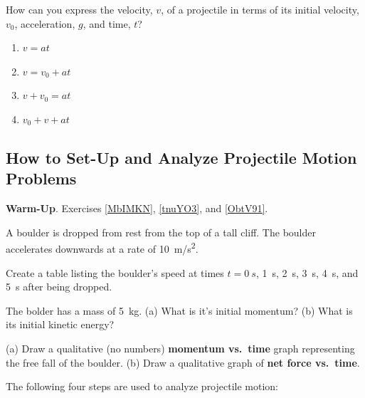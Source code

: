 \documentclass[main-physics.tex]{subfiles}
\begin{document}
\begin{exercise} \label{wlbvvu}
    How can you express the velocity, $v$, of a projectile in terms of its initial velocity, $v_0$, acceleration, $g$, and time, $t$?
\end{exercise}

\begin{enumerate}[label=\Alph*.]
    \item $v = at$
    \item $v = v_0 + a t$
    \item $v + v_0 = at$
    \item $v_0 + v + at$
\end{enumerate} 

\subsection{How to Set-Up and Analyze Projectile Motion Problems} \label{Qxc2Cv}

\begin{mdframed}[backgroundcolor=csOrange]
    \textbf{Warm-Up}. Exercises \ref{MbIMKN}, \ref{tnuYO3}, and \ref{ObtV91}.

    \vspace{1ex}
    
    A boulder is dropped from rest from the top of a tall cliff. The boulder accelerates downwards at a rate of \SI{10}{m/s^2}.

    \begin{exercise} \label{MbIMKN}
        Create a table listing the boulder's speed at times $t = \SI{0}{s}$, \SI{1}{s}, \SI{2}{s}, \SI{3}{s}, \SI{4}{s}, and \SI{5}{s} after being dropped.
    \end{exercise}

    \begin{exercise} \label{tnuYO3}
        The bolder has a mass of \SI{5}{kg}. (a) What is it's initial momentum? (b) What is its initial kinetic energy?
    \end{exercise}

    \begin{exercise} \label{ObtV91}
        (a) Draw a qualitative (no numbers) \textbf{momentum vs.~time} graph representing the free fall of the boulder. (b) Draw a qualitative graph of \textbf{net force vs.~time}.
    \end{exercise}
\end{mdframed}


The following four steps are used to analyze projectile motion:
\end{document}
